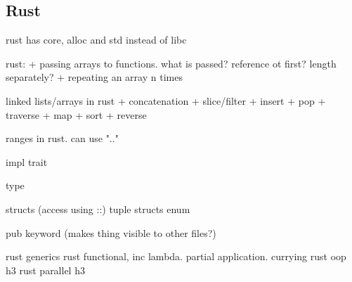 
\subsection{Rust}

rust has core, alloc and std instead of libc

rust:
+ passing arrays to functions. what is passed? reference ot first? length separately?
+ repeating an array n times


linked lists/arrays in rust
+ concatenation
+ slice/filter
+ insert
+ pop
+ traverse
+ map
+ sort
+ reverse

ranges in rust. can use ".."

impl
trait

type

structs (access using ::)
tuple structs
enum

pub keyword (makes thing visible to other files?)

rust generics
rust functional, inc lambda. partial application. currying
rust oop h3
rust parallel h3



